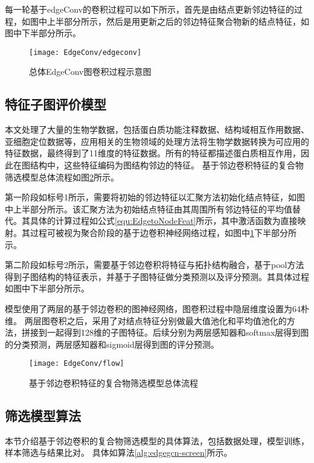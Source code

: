 每一轮基于edgeConv的卷积过程可以如下所示，首先是由结点更新邻边特征的过程，如图中上半部分所示，然后是用更新之后的邻边特征聚合物新的结点特征，如图中下半部分所示。

\begin{figure}[htbp]
    \centering
    \texttt{[image: EdgeConv/edgeconv]}
    \caption{总体EdgeConv图卷积过程示意图}
    \label{fig:EdgeConv/edgeconv}
\end{figure}

\subsection{特征子图评价模型}

本文处理了大量的生物学数据，包括蛋白质功能注释数据、结构域相互作用数据、亚细胞定位数据等，应用相关的生物领域的处理方法将生物学数据转换为可应用的特征数据，最终得到了11维度的特征数据。所有的特征都描述蛋白质相互作用，因此在图结构中，这些特征编码为图结构邻边的特征。
基于邻边卷积特征的复合物筛选模型总体流程如图\ref{fig:EdgeConv/flow}所示。

第一阶段如标号1所示，需要将初始的邻边特征以汇聚方法初始化结点特征，如图中上半部分所示。该汇聚方法为初始结点特征由其周围所有邻边特征的平均值替代。其具体的计算过程如公式\ref{equ:EdgetoNodeFeat}所示，其中激活函数为直接映射。其过程可被视为聚合阶段的基于边卷积神经网络过程，如图中\ref{fig:EdgeConv/edgeconv}下半部分所示。

第二阶段如标号2所示，需要基于邻边卷积将特征与拓扑结构融合，基于pool方法得到子图结构的特征表示，并基于子图特征做分类预测以及评分预测。其具体过程如图中下半部分所示。

模型使用了两层的基于邻边卷积的图神经网络，图卷积过程中隐层维度设置为64朴维。
两层图卷积之后，采用了对结点特征分别做最大值池化和平均值池化的方法，拼接到一起得到128维的子图特征。后续分别为两层感知器和softmax层得到图的分类预测，两层感知器和sigmoid层得到图的评分预测。


\begin{figure}[htbp]
    \centering
    \texttt{[image: EdgeConv/flow]}
    \caption{基于邻边卷积特征的复合物筛选模型总体流程}
    \label{fig:EdgeConv/flow}
\end{figure}

\subsection{筛选模型算法}
本节介绍基于邻边卷积的复合物筛选模型的具体算法，包括数据处理，模型训练，样本筛选与结果比对。
具体如算法\ref{alg:edgegcn-screen}所示。

